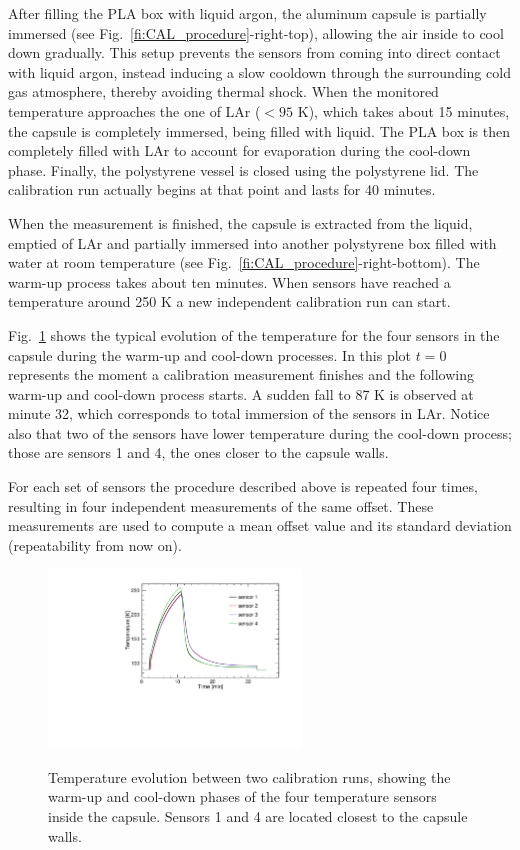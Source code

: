 After filling the PLA box with liquid argon, the aluminum capsule is partially immersed (see Fig.~\ref{fi:CAL_procedure}-right-top), allowing the air inside to cool down gradually. This setup prevents the sensors from coming into direct contact with liquid argon, instead inducing a slow cooldown through the surrounding cold gas atmosphere, thereby avoiding thermal shock. When the monitored temperature approaches the one of LAr ($< 95$ K), which takes about 15 minutes, the capsule is completely immersed, being filled with liquid. The PLA box is then completely filled with LAr to account for evaporation during the cool-down phase. Finally, the polystyrene vessel is closed using the polystyrene lid. The calibration run actually begins at that point and lasts for 40 minutes.

When the measurement is finished, the capsule is extracted from the liquid, emptied of LAr and partially immersed into another polystyrene box filled with water at room temperature (see Fig.~\ref{fi:CAL_procedure}-right-bottom). The warm-up process takes about ten minutes. When sensors have reached a temperature around 250 K a new independent calibration run can start.

Fig.~\ref{fi:CAL_pre} shows the typical evolution of the temperature for the four sensors in the capsule during the warm-up and cool-down processes. In this plot $t=0$ represents the moment a calibration measurement finishes and the following warm-up and cool-down process starts. A sudden fall to 87 K is observed at minute 32, which corresponds to total immersion of the sensors in LAr. Notice also that two of the sensors have lower temperature during the cool-down process; those are sensors 1 and 4, the ones closer to the capsule walls.

For each set of sensors the procedure described above is repeated four times, resulting in four independent measurements of the same offset. These measurements are used to compute a mean offset value and its standard deviation (repeatability from now on).

\begin{figure}[htbp]
\centering
{\includegraphics[width=0.6\textwidth]{./figure_9.pdf}}
\caption{Temperature evolution between two calibration runs, showing the warm-up and cool-down phases of the four temperature sensors inside the capsule. Sensors 1 and 4 are located closest to the capsule walls.}
\label{fi:CAL_pre}
\end{figure}

